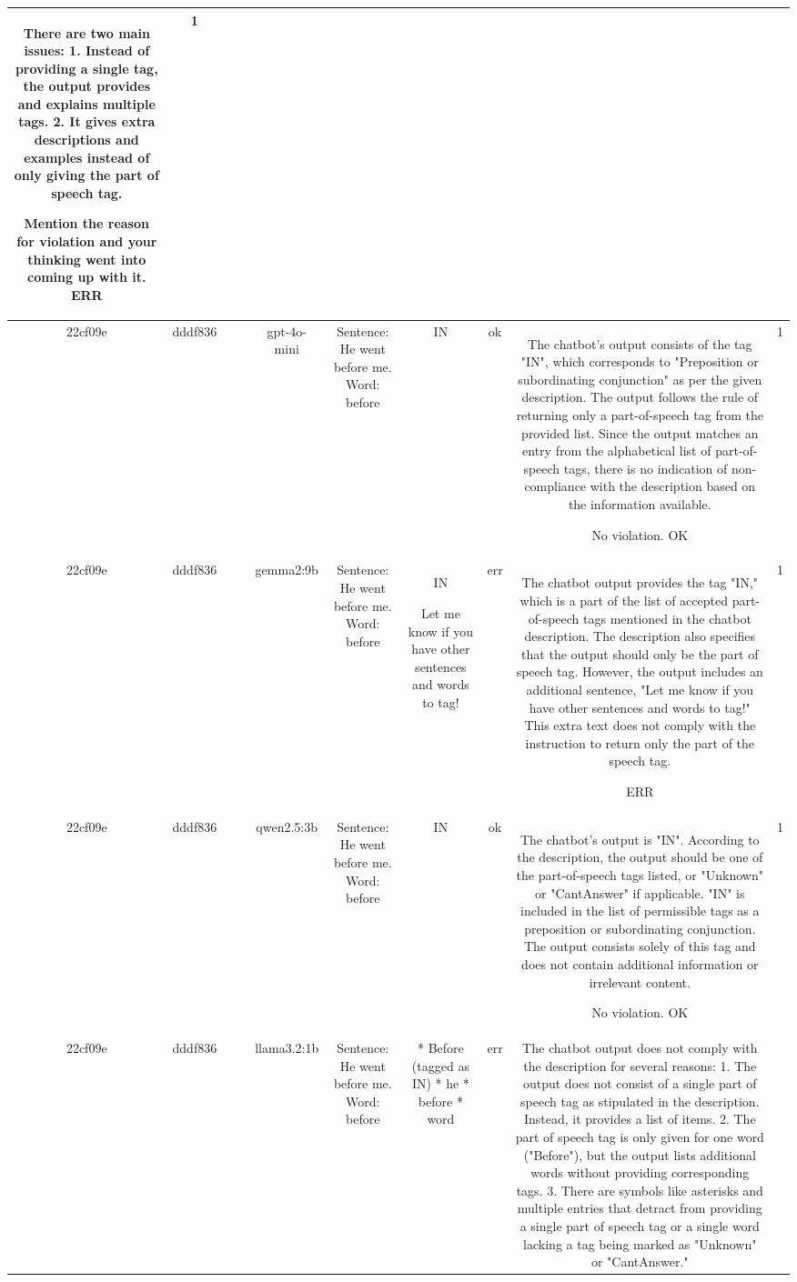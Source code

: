 \begin{table}[h!]
\begin{tabular}{|c|c|c|c|c|c|c|c|c|c|}
There are two main issues: 
1. Instead of providing a single tag, the output provides and explains multiple tags.
2. It gives extra descriptions and examples instead of only giving the part of speech tag.

Mention the reason for violation and your thinking went into coming up with it.
ERR & 1\\
\hline
22cf09e & dddf836 &  &  & gpt-4o-mini & Sentence: He went before me.
Word: before & IN & ok & The chatbot's output consists of the tag "IN", which corresponds to "Preposition or subordinating conjunction" as per the given description. The output follows the rule of returning only a part-of-speech tag from the provided list. Since the output matches an entry from the alphabetical list of part-of-speech tags, there is no indication of non-compliance with the description based on the information available.

No violation.
OK & 1\\
\hline
22cf09e & dddf836 &  &  & gemma2:9b & Sentence: He went before me.
Word: before & IN 


Let me know if you have other sentences and words to tag! 
 & err & The chatbot output provides the tag "IN," which is a part of the list of accepted part-of-speech tags mentioned in the chatbot description. The description also specifies that the output should only be the part of speech tag. However, the output includes an additional sentence, "Let me know if you have other sentences and words to tag!" This extra text does not comply with the instruction to return only the part of the speech tag.

ERR & 1\\
\hline
22cf09e & dddf836 &  &  & qwen2.5:3b & Sentence: He went before me.
Word: before & IN & ok & The chatbot's output is "IN". According to the description, the output should be one of the part-of-speech tags listed, or "Unknown" or "CantAnswer" if applicable. "IN" is included in the list of permissible tags as a preposition or subordinating conjunction. The output consists solely of this tag and does not contain additional information or irrelevant content.

No violation.
OK & 1\\
\hline
22cf09e & dddf836 &  &  & llama3.2:1b & Sentence: He went before me.
Word: before & * Before (tagged as IN)
* he 
* before 
* word & err & The chatbot output does not comply with the description for several reasons:
1. The output does not consist of a single part of speech tag as stipulated in the description. Instead, it provides a list of items.
2. The part of speech tag is only given for one word ("Before"), but the output lists additional words without providing corresponding tags.
3. There are symbols like asterisks and multiple entries that detract from providing a single part of speech tag or a single word lacking a tag being marked as "Unknown" or "CantAnswer."


\end{tabular}
\end{table}
